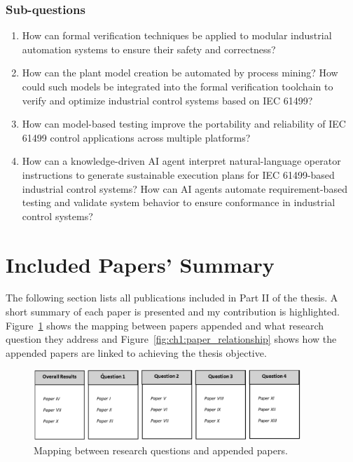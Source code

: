 \subsubsection{Sub-questions}
\begin{enumerate}
    \item How can formal verification techniques be applied to modular industrial automation systems to ensure their safety and correctness?
    
    \item How can the plant model creation be automated by process mining? How could such models be integrated into the formal verification toolchain to verify and optimize industrial control systems based on IEC 61499?
    
    \item How can model-based testing improve the portability and reliability of IEC 61499 control applications across multiple platforms?
    
    \item How can a knowledge-driven AI agent interpret natural-language operator instructions to generate sustainable execution plans for IEC 61499-based industrial control systems? How can AI agents automate requirement-based testing and validate system behavior to ensure conformance in industrial control systems?
\end{enumerate}

\section{Included Papers' Summary}
The following section lists all publications included in Part II of the thesis. A short summary of each paper is presented and my contribution is highlighted. Figure~\ref{fig:ch1:research_mapping} shows the mapping between papers appended and what research question they address and Figure~\ref{fig:ch1:paper_relationship} shows how the appended papers are linked to achieving the thesis objective.

\begin{figure}[htbp]
    \centering
    \includegraphics[width=0.9\textwidth]{chapters/images/chapter1/relationship_papers_researchquestions.png}
    \caption{Mapping between research questions and appended papers.}
    \label{fig:ch1:research_mapping}
\end{figure}

